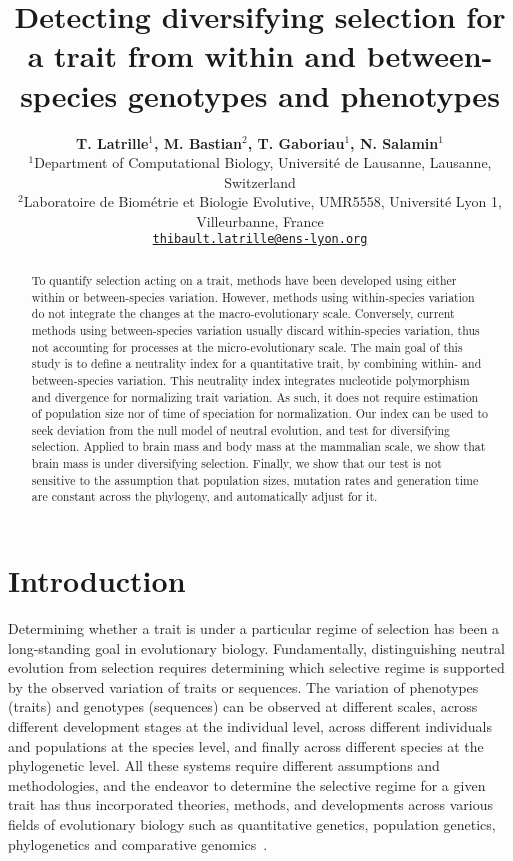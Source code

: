 \documentclass{article}
\title{Detecting diversifying selection for a trait from within and between-species genotypes and phenotypes}
\author{
\large
\textbf{T. {Latrille}$^{1}$\orcidlink{0000-0002-9643-4668}, M. {Bastian}$^{2}$\orcidlink{0009-0003-9129-6918}, T. {Gaboriau}$^{1}$\orcidlink{0000-0001-7530-2204}, N. {Salamin}$^{1}$\orcidlink{0000-0002-3963-4954}}\\
\normalsize
$^{1}$Department of Computational Biology, Université de Lausanne, Lausanne, Switzerland\\
$^{2}$Laboratoire de Biométrie et Biologie Evolutive, UMR5558, Université Lyon 1, Villeurbanne, France \\
\texttt{\href{mailto:thibault.latrille@ens-lyon.org}{thibault.latrille@ens-lyon.org}} \\
}
\begin{document}
\sbox{\Maketitle}{%
\begin{minipage}{\textwidth}
\maketitle
\end{minipage}}
\noindent\usebox{\Maketitle}

\begin{abstract}
    To quantify selection acting on a trait, methods have been developed using either within or between-species variation.
    However, methods using within-species variation do not integrate the changes at the macro-evolutionary scale.
    Conversely, current methods using between-species variation usually discard within-species variation, thus not accounting for processes at the micro-evolutionary scale.
    The main goal of this study is to define a neutrality index for a quantitative trait, by combining within- and between-species variation.
    This neutrality index integrates nucleotide polymorphism and divergence for normalizing trait variation.
    As such, it does not require estimation of population size nor of time of speciation for normalization.
    Our index can be used to seek deviation from the null model of neutral evolution, and test for diversifying selection.
    Applied to brain mass and body mass at the mammalian scale, we show that brain mass is under diversifying selection.
    Finally, we show that our test is not sensitive to the assumption that population sizes, mutation rates and generation time are constant across the phylogeny, and automatically adjust for it.
\end{abstract}


\section*{Introduction}\label{sec:introduction}

Determining whether a trait is under a particular regime of selection has been a long-standing goal in evolutionary biology.
Fundamentally, distinguishing neutral evolution from selection requires determining which selective regime is supported by the observed variation of traits or sequences.
The variation of phenotypes (traits) and genotypes (sequences) can be observed at different scales, across different development stages at the individual level, across different individuals and populations at the species level, and finally across different species at the phylogenetic level.
All these systems require different assumptions and methodologies, and the endeavor to determine the selective regime for a given trait has thus incorporated theories, methods, and developments across various fields of evolutionary biology such as quantitative genetics, population genetics, phylogenetics and comparative genomics~\parencite{lynch_genetics_1998, walsh_evolution_2018}.
\end{document}
